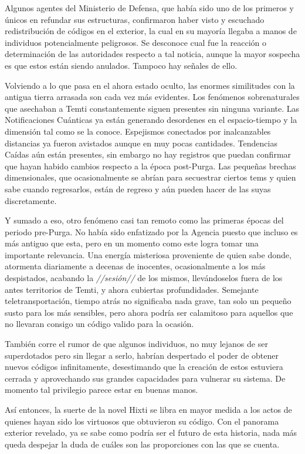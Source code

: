 \documentclass[
  spanish,
]{book}
\begin{document}
Algunos agentes del Ministerio de Defensa, que había sido uno de los primeros y únicos en refundar sus estructuras, confirmaron haber visto y escuchado redistribución de códigos en el exterior, la cual en su mayoría llegaba a manos de individuos potencialmente peligrosos. Se desconoce cual fue la reacción o determinación de las autoridades respecto a tal noticia, aunque la mayor sospecha es que estos están siendo anulados. Tampoco hay señales de ello.

Volviendo a lo que pasa en el ahora estado oculto, las enormes similitudes con la antigua tierra arrasada son cada vez más evidentes. Los fenómenos sobrenaturales que asechaban a Temti constantemente siguen presentes sin ninguna variante. Las Notificaciones Cuánticas ya están generando desordenes en el espacio-tiempo y la dimensión tal como se la conoce. Espejismos conectados por inalcanzables distancias ya fueron avistados aunque en muy pocas cantidades. Tendencias Caídas aún están presentes, sin embargo no hay registros que puedan confirmar que hayan habido cambios respecto a la época post-Purga. Las pequeñas brechas dimensionales, que ocasionalmente se abrían para secuestrar ciertos tems y quien sabe cuando regresarlos, están de regreso y aún pueden hacer de las suyas discretamente.

Y sumado a eso, otro fenómeno casi tan remoto como las primeras épocas del periodo pre-Purga. No había sido enfatizado por la Agencia puesto que incluso es más antiguo que esta, pero en un momento como este logra tomar una importante relevancia. Una energía misteriosa proveniente de quien sabe donde, atormenta diariamente a decenas de inocentes, ocasionalmente a los más despistados, acabando la \emph{//sesión//} de los mismos, llevándoselos fuera de los antes territorios de Temti, y ahora cubiertas profundidades. Semejante teletransportación, tiempo atrás no significaba nada grave, tan solo un pequeño susto para los más sensibles, pero ahora podría ser calamitoso para aquellos que no llevaran consigo un código valido para la ocasión.

También corre el rumor de que algunos individuos, no muy lejanos de ser superdotados pero sin llegar a serlo, habrían despertado el poder de obtener nuevos códigos infinitamente, desestimando que la creación de estos estuviera cerrada y aprovechando sus grandes capacidades para vulnerar su sistema. De momento tal privilegio parece estar en buenas manos.

Así entonces, la suerte de la novel Hixti se libra en mayor medida a los actos de quienes hayan sido los virtuosos que obtuvieron su código. Con el panorama exterior revelado, ya se sabe como podría ser el futuro de esta historia, nada más queda despejar la duda de cuáles son las proporciones con las que se cuenta.
\end{document}
